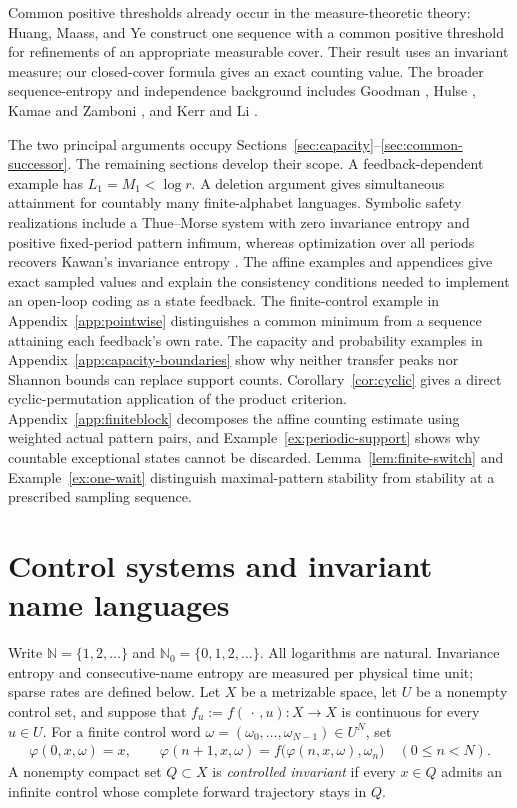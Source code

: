 \documentclass[11pt,reqno]{amsart}
\numberwithin{equation}{section}
\theoremstyle{definition}
\newcommand{\N}{\mathbb N}
\newcommand{\Nzero}{\mathbb N_0}
\begin{document}
Common positive thresholds already occur in the measure-theoretic
theory: Huang, Maass, and Ye \cite[Lemma~3.3 and Theorem~3.5]{HuangMaassYe2004}
construct one sequence with a common positive threshold for refinements
of an appropriate measurable cover. Their result uses an invariant
measure; our closed-cover formula gives an exact counting value.
The broader sequence-entropy and independence background includes
Goodman \cite{Goodman1974}, Hulse \cite{Hulse1982}, Kamae and Zamboni
\cite{KamaeZamboniSystems2002}, and Kerr and Li \cite{KL2007,KL2009}.

The two principal arguments occupy
Sections~\ref{sec:capacity}--\ref{sec:common-successor}.
The remaining sections develop their scope. A feedback-dependent
example has $L_1=M_1<\log r$. A deletion argument gives simultaneous
attainment for countably many finite-alphabet languages. Symbolic safety
realizations include a Thue--Morse system with zero invariance entropy
and positive fixed-period pattern infimum, whereas optimization over
all periods recovers Kawan's invariance entropy \cite{Kawan2013}.
The affine examples and appendices give exact sampled values and
explain the consistency conditions needed to implement an open-loop
coding as a state feedback. The finite-control example in
Appendix~\ref{app:pointwise} distinguishes a common minimum from a
sequence attaining each feedback's own rate. The capacity and
probability examples in Appendix~\ref{app:capacity-boundaries} show
why neither transfer peaks nor Shannon bounds can replace support counts.
Corollary~\ref{cor:cyclic} gives a direct cyclic-permutation application
of the product criterion. Appendix~\ref{app:finiteblock} decomposes the
affine counting estimate using weighted actual pattern pairs, and
Example~\ref{ex:periodic-support} shows why countable exceptional states
cannot be discarded. Lemma~\ref{lem:finite-switch} and
Example~\ref{ex:one-wait} distinguish maximal-pattern stability from
stability at a prescribed sampling sequence.


\section{Control systems and invariant name languages}\label{sec:control}

Write $\N=\{1,2,\ldots\}$ and $\Nzero=\{0,1,2,\ldots\}$.
All logarithms are natural. Invariance entropy and consecutive-name entropy
are measured per physical time unit; sparse rates are defined below.
Let $X$ be a
metrizable space, let $U$ be a nonempty control set, and suppose that
$f_u:=f(\,\cdot\,,u):X\to X$ is continuous for every $u\in U$.  For a finite
control word $\omega=(\omega_0,\ldots,\omega_{N-1})\in U^N$, set
\begin{align*}
 \varphi(0,x,\omega)=x,
 \qquad
 \varphi(n+1,x,\omega)
 =f\bigl(\varphi(n,x,\omega),\omega_n\bigr)
 \quad(0\le n<N).
\end{align*}
A nonempty compact set $Q\subset X$ is \emph{controlled invariant} if every
$x\in Q$ admits an infinite control whose complete forward trajectory stays in
$Q$.
\end{document}
